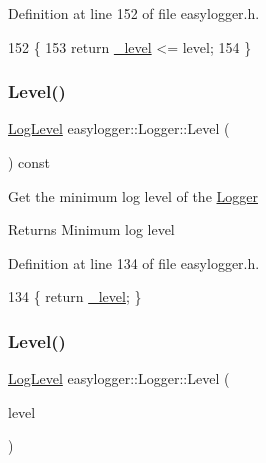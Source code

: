 Definition at line 152 of file easylogger.\+h.


\begin{DoxyCode}
152                                            \{
153             \textcolor{keywordflow}{return} \mbox{\hyperlink{classeasylogger_1_1_logger_a123849db1e8dd97fa7e0eeedc4bcb747}{\_level}} <= level;
154         \}
\end{DoxyCode}
\mbox{\label{classeasylogger_1_1_logger_a350e161f9afb8a6dd764b297aa0baf93}} 
\subsubsection{\texorpdfstring{Level()}{Level()}\hspace{0.1cm}{\footnotesize\ttfamily [1/2]}}
{\footnotesize\ttfamily \mbox{\hyperlink{namespaceeasylogger_a68cb882ead21af982c40e3621fcd50b0}{Log\+Level}} easylogger\+::\+Logger\+::\+Level (\begin{DoxyParamCaption}{ }\end{DoxyParamCaption}) const\hspace{0.3cm}{\ttfamily [inline]}}

Get the minimum log level of the \mbox{\hyperlink{classeasylogger_1_1_logger}{Logger}}

\begin{DoxyReturn}{Returns}
Minimum log level 
\end{DoxyReturn}


Definition at line 134 of file easylogger.\+h.


\begin{DoxyCode}
134 \{ \textcolor{keywordflow}{return} \mbox{\hyperlink{classeasylogger_1_1_logger_a123849db1e8dd97fa7e0eeedc4bcb747}{\_level}}; \}
\end{DoxyCode}
\mbox{\label{classeasylogger_1_1_logger_a66ab7ca8dbdfcdeda3395bc39efc8c1c}} 
\subsubsection{\texorpdfstring{Level()}{Level()}\hspace{0.1cm}{\footnotesize\ttfamily [2/2]}}
{\footnotesize\ttfamily \mbox{\hyperlink{namespaceeasylogger_a68cb882ead21af982c40e3621fcd50b0}{Log\+Level}} easylogger\+::\+Logger\+::\+Level (\begin{DoxyParamCaption}\item[{\mbox{\hyperlink{namespaceeasylogger_a68cb882ead21af982c40e3621fcd50b0}{Log\+Level}}}]{level }\end{DoxyParamCaption})\hspace{0.3cm}{\ttfamily [inline]}}

